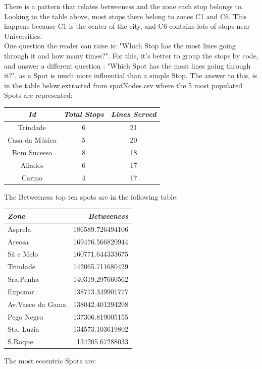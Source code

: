 \documentclass[12pt]{article}
\begin{document}
\begin{multicols}{2}
There is a pattern that relates betweeness and the zone each stop belongs to. Looking to the table above,  most stops there belong to zones C1 and C6. This happens because C1 is the center of the city, and C6 contains lots of stops near Universities.\\
One question the reader can raise is: "Which Stop has the most lines going through it and how many times?". For this, it's better to group the stops by code, and answer a different question : "Which Spot has the most lines going through it?", as a Spot is much more influential than a simple Stop. The answer to this, is in the table below,extracted from spotNodes.csv where the 5 most populated Spots are represented:
\begin{center}
\begin{tabular}[h]{ |c|c|c| }
\hline
    \em{Id}  & \em{Total Stops} & \em{Lines Served}\\
    \hline
    Trindade & 6  & 21 \\
    Casa da Música & 5 & 20 \\
    Bom Sucesso  & 8 & 18 \\
    Aliados & 6 & 17 \\
    Carmo & 4 & 17 \\
\hline
\end{tabular}
\end{center}
The Betweeness top ten spots are in the following table:
\begin{center}
\begin{tabular}[h]{|l|r|}
\hline
\em{Zone} & \em{Betweeness}\\
\hline
Asprela & 186589.726494106\\
Areosa & 169476.566820944\\
Sá e Melo  & 160771.644333675\\
Trindade & 142065.711680429\\
Sra.Penha & 140319.297660562\\
Exponor & 138773.349901777\\
Av.Vasco da Gama & 138042.401294208\\
Pego Negro & 137306.819005155\\
Sta. Luzia & 134573.103619802\\
S.Roque & 134205.67288033\\
\hline
\end{tabular}
\end{center}
The most eccentric Spots are:\\

\end{multicols}
\end{document}
